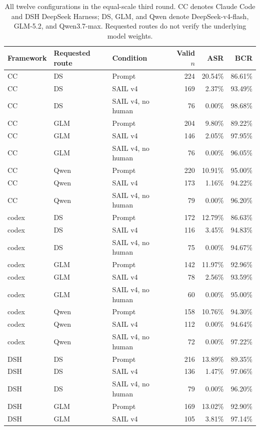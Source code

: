 \begin{table}[p]
\centering
\caption{All twelve configurations in the equal-scale third round. CC denotes Claude Code and DSH DeepSeek Harness; DS, GLM, and Qwen denote DeepSeek-v4-flash, GLM-5.2, and Qwen3.7-max. Requested routes do not verify the underlying model weights.}
\label{tab:sail_v4_matched_matrix}
\setlength{\tabcolsep}{3pt}
\begin{tabular}{lllrrr}
\toprule
Framework & Requested route & Condition & Valid $n$ & ASR & BCR \\
\midrule
CC & DS & Prompt & 224 & 20.54\% & 86.61\% \\
CC & DS & SAIL v4 & 169 & 2.37\% & 93.49\% \\
CC & DS & SAIL v4, no human & 76 & 0.00\% & 98.68\% \\
CC & GLM & Prompt & 204 & 9.80\% & 89.22\% \\
CC & GLM & SAIL v4 & 146 & 2.05\% & 97.95\% \\
CC & GLM & SAIL v4, no human & 76 & 0.00\% & 96.05\% \\
CC & Qwen & Prompt & 220 & 10.91\% & 95.00\% \\
CC & Qwen & SAIL v4 & 173 & 1.16\% & 94.22\% \\
CC & Qwen & SAIL v4, no human & 79 & 0.00\% & 96.20\% \\
codex & DS & Prompt & 172 & 12.79\% & 86.63\% \\
codex & DS & SAIL v4 & 116 & 3.45\% & 94.83\% \\
codex & DS & SAIL v4, no human & 75 & 0.00\% & 94.67\% \\
codex & GLM & Prompt & 142 & 11.97\% & 92.96\% \\
codex & GLM & SAIL v4 & 78 & 2.56\% & 93.59\% \\
codex & GLM & SAIL v4, no human & 60 & 0.00\% & 95.00\% \\
codex & Qwen & Prompt & 158 & 10.76\% & 94.30\% \\
codex & Qwen & SAIL v4 & 112 & 0.00\% & 94.64\% \\
codex & Qwen & SAIL v4, no human & 72 & 0.00\% & 97.22\% \\
DSH & DS & Prompt & 216 & 13.89\% & 89.35\% \\
DSH & DS & SAIL v4 & 136 & 1.47\% & 97.06\% \\
DSH & DS & SAIL v4, no human & 79 & 0.00\% & 96.20\% \\
DSH & GLM & Prompt & 169 & 13.02\% & 92.90\% \\
DSH & GLM & SAIL v4 & 105 & 3.81\% & 97.14\% \\

\end{tabular}
\end{table}
